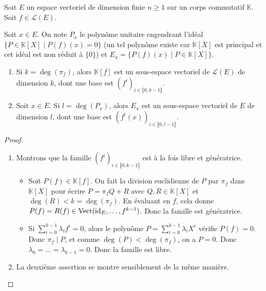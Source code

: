 






  Soit $E$ un espace vectoriel de dimension finie $n \geq 1$ sur un corps commutatif $\mathbb{K}$. Soit $f \in \mathcal{L}(E)$.

  \begin{notation}
    Soit $x \in E$. On note $P_x$ le polynôme unitaire engendrant l'idéal $\{ P \in \mathbb{K}[X] \mid P(f)(x) = 0 \}$ (un tel polynôme existe car $\mathbb{K}[X]$ est principal et cet idéal est non réduit à $\{ 0 \}$) et $E_x = \{ P(f)(x) \mid P \in \mathbb{K}[X] \}$.
  \end{notation}

  \begin{lemma}
    \label{invariants-de-similitude-1}
    \begin{enumerate}[label={\bfseries(\roman*)}]
      \item Si $k = \deg(\pi_f)$, alors $\mathbb{K}[f]$ est un sous-espace vectoriel de $\mathcal{L}(E)$ de dimension $k$, dont une base est $(f^i)_{i \in \llbracket 0, k-1 \rrbracket}$.
      \item Soit $x \in E$. Si $l = \deg(P_x)$, alors $E_x$ est un sous-espace vectoriel de $E$ de dimension $l$, dont une base est $(f^i(x))_{i \in \llbracket 0, l-1 \rrbracket}$.
    \end{enumerate}
  \end{lemma}


  \begin{proof}
    \begin{enumerate}[label={\bfseries(\roman*)}]
      \item Montrons que la famille $(f^i)_{i \in \llbracket 0, k-1 \rrbracket}$ est à la fois libre et génératrice.
      \begin{itemize}
        \item Soit $P(f) \in \mathbb{K}[f]$. On fait la division euclidienne de $P$ par $\pi_f$ dans $\mathbb{K}[X]$ pour écrire $P = \pi_f Q + R$ avec $Q, R \in \mathbb{K}[X]$ et $\deg(R) < k = \deg(\pi_f)$. En évaluant en $f$, cela donne $P(f) = R(f) \in \operatorname{Vect}(\operatorname{id}_E, \dots, f^{k-1})$. Donc la famille est génératrice.
        \item Si $\sum_{i=0}^{k-1} \lambda_i f^i = 0$, alors le polynôme $P = \sum_{i=0}^{k-1} \lambda_i X^i$ vérifie $P(f) = 0$. Donc $\pi_f \mid P$, et comme $\deg(P) < \deg(\pi_f)$, on a $P = 0$. Donc $\lambda_0 = \dots = \lambda_{k-1} = 0$. Donc la famille est libre.
      \end{itemize}
      \item La deuxième assertion se montre sensiblement de la même manière.
    \end{enumerate}
  \end{proof}

